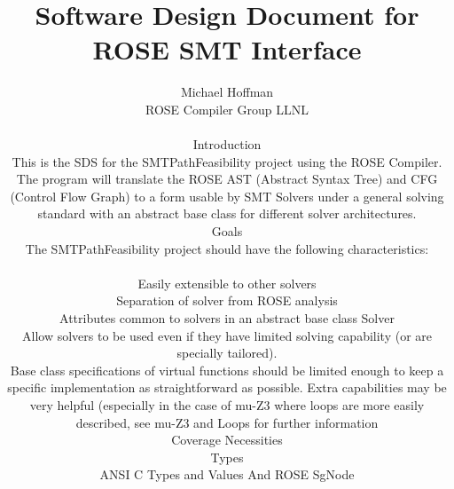 \documentclass[11pt]{article}
\begin{document}
\title{Software Design Document for ROSE SMT Interface}
\author{Michael Hoffman\\
ROSE Compiler Group LLNL\\
\renewcommand{\today}{March 2, 2016}
\maketitle

\section{Introduction}
This is the SDS for the SMTPathFeasibility project using the ROSE Compiler. The program will translate the ROSE AST (Abstract Syntax Tree) and CFG (Control Flow Graph) to a form usable by SMT Solvers under a general solving standard with an abstract base class for different solver architectures.
\section{Goals}
The SMTPathFeasibility project should have the following characteristics:\\
\begin{enumeration}
\item Easily extensible to other solvers
\begin{enumeration}
\item Separation of solver from ROSE analysis
\item Attributes common to solvers in an abstract base class Solver
\item Allow solvers to be used even if they have limited solving capability (or are specially tailored). 
\item Base class specifications of virtual functions should be limited enough to keep a specific implementation as straightforward as possible. Extra capabilities may be very helpful (especially in the case of mu-Z3 where loops are more easily described, see mu-Z3 and Loops for further information 
\end{enumeration}
\end{enumeration}
\section{Coverage Necessities}
\section{Types}
\section{ANSI C Types and Values And ROSE SgNode}
}
\end{document}
